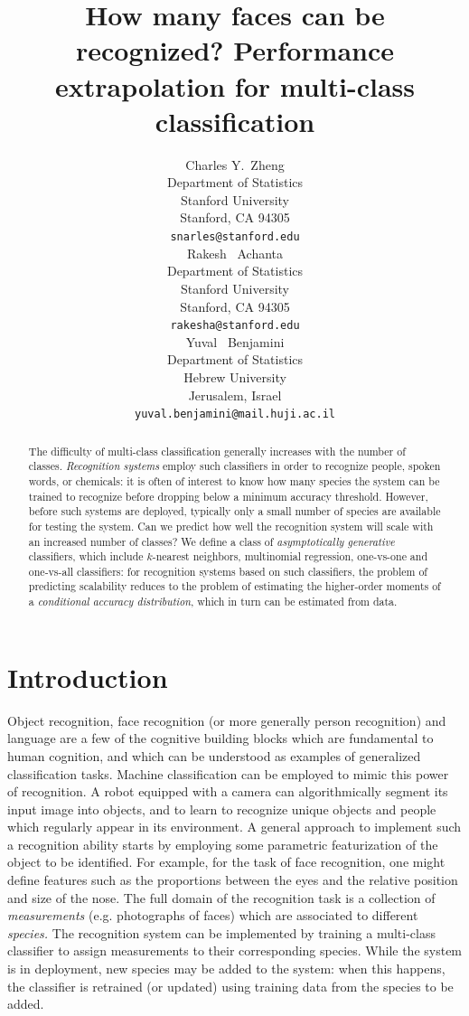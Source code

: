 \documentclass{article}
\title{How many faces can be recognized? Performance extrapolation for
  multi-class classification}
\author{
  Charles Y.~Zheng \\
  Department of Statistics\\
  Stanford University\\
  Stanford, CA 94305 \\
  \texttt{snarles@stanford.edu} \\
  \And
  Rakesh ~Achanta \\
  Department of Statistics\\
  Stanford University\\
  Stanford, CA 94305 \\
  \texttt{rakesha@stanford.edu} \\
  \And
  Yuval ~Benjamini \\
  Department of Statistics \\
  Hebrew University\\
  Jerusalem, Israel\\
  \texttt{yuval.benjamini@mail.huji.ac.il}
}
\begin{document}

\maketitle

\begin{abstract}
The difficulty of multi-class classification generally increases with
the number of classes.  \emph{Recognition systems} employ such
classifiers in order to recognize people, spoken words, or chemicals:
it is often of interest to know how many species the system can be
trained to recognize before dropping below a minimum accuracy
threshold.  However, before such systems are deployed, typically only
a small number of species are available for testing the system.  Can
we predict how well the recognition system will scale with an
increased number of classes?  We define a class of
\emph{asymptotically generative} classifiers, which include
$k$-nearest neighbors, multinomial regression, one-vs-one and
one-vs-all classifiers: for recognition systems based on such
classifiers, the problem of predicting scalability reduces to the
problem of estimating the higher-order moments of a \emph{conditional
  accuracy distribution}, which in turn can be estimated from data.
\end{abstract}

\section{Introduction}

Object recognition, face recognition (or more generally person
recognition) and language are a few of the cognitive building blocks
which are fundamental to human cognition, and which can be understood
as examples of generalized classification tasks. Machine
classification can be employed to mimic this power of recognition.  A
robot equipped with a camera can algorithmically segment its input
image into objects, and to learn to recognize unique objects and
people which regularly appear in its environment.  A general approach
to implement such a recognition ability starts by employing some
parametric featurization of the object to be identified.  For example,
for the task of face recognition, one might define features such as
the proportions between the eyes and the relative position and size of
the nose.  The full domain of the recognition task is a collection of
\emph{measurements} (e.g. photographs of faces) which are associated to different
\emph{species.}  The recognition system can be implemented by training
a multi-class classifier to assign measurements to their corresponding
species.  While the system is in deployment, new species may be added
to the system: when this happens, the classifier is retrained (or
updated) using training data from the species to be added.
\end{document}
